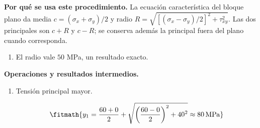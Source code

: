 \noindent\textbf{Por qué se usa este procedimiento.} La ecuación característica del bloque plano da media $c=(\sigma_x+\sigma_y)/2$ y radio $R=\sqrt{[(\sigma_x-\sigma_y)/2]^2+\tau_{xy}^2}$. Las dos principales son $c+R$ y $c-R$; se conserva además la principal fuera del plano cuando corresponda.

\begin{enumerate}

\item El radio vale $50$ MPa, un resultado exacto.

\end{enumerate}

\noindent\textbf{Operaciones y resultados intermedios.}

\begin{enumerate}

\item Tensión principal mayor.

\[\fitmath{y_{1}=\frac{60+0}{2}+\sqrt{{\left(\frac{60-0}{2}\right)}^{2}+{40}^{2}}\approx 80\,\mathrm{MPa}}\]

\end{enumerate}

